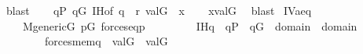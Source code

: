 \begin{isabellebody}
\ blast\isanewline
\ \ \isamarkupfalse%
\ {\isacartoucheopen}q{\isasymin}P{\isacartoucheclose}\ {\isacartoucheopen}q{\isasymin}G{\isacartoucheclose}\ IH{\isacharbrackleft}{\kern0pt}of\ q\ {\isasymsigma}{\isacharbrackright}{\kern0pt}\ {\isacartoucheopen}{\isasymlangle}{\isasymsigma}{\isacharcomma}{\kern0pt}r{\isasymrangle}{\isasymin}{\isasymtheta}{\isacartoucheclose}\ {\isacartoucheopen}val{\isacharparenleft}{\kern0pt}G{\isacharcomma}{\kern0pt}{\isasymsigma}{\isacharparenright}{\kern0pt}\ {\isacharequal}{\kern0pt}\ x{\isacartoucheclose}\isanewline
\ \ \isamarkupfalse%
\ {\isachardoublequoteopen}x{\isasymin}val{\isacharparenleft}{\kern0pt}G{\isacharcomma}{\kern0pt}{\isasymtau}{\isacharparenright}{\kern0pt}{\isachardoublequoteclose}\ \isamarkupfalse%
\ {\isacharparenleft}{\kern0pt}blast{\isacharparenright}{\kern0pt}\isanewline
{}\isamarkupfalse%
%
\endisatagproof
{\isafoldproof}%
%
\isadelimproof
\isanewline
%
\endisadelimproof
\isanewline
\isanewline
{}\isamarkupfalse%
\ IV{}{}{}a{\isacharunderscore}{\kern0pt}eq{\isacharcolon}{\kern0pt}\isanewline
\ \ \isanewline
\ \ \ \ {\isachardoublequoteopen}M{\isacharunderscore}{\kern0pt}generic{\isacharparenleft}{\kern0pt}G{\isacharparenright}{\kern0pt}{\isachardoublequoteclose}\ {\isachardoublequoteopen}p{\isasymin}G{\isachardoublequoteclose}\ {\isachardoublequoteopen}forces{\isacharunderscore}{\kern0pt}eq{\isacharparenleft}{\kern0pt}p{\isacharcomma}{\kern0pt}{\isasymtau}{\isacharcomma}{\kern0pt}{\isasymtheta}{\isacharparenright}{\kern0pt}{\isachardoublequoteclose}\isanewline
\ \ \ \ \isanewline
\ \ \ \ IH{\isacharcolon}{\kern0pt}{\isachardoublequoteopen}{\isasymAnd}q\ {\isasymsigma}{\isachardot}{\kern0pt}\ q{\isasymin}P\ {\isasymLongrightarrow}\ q{\isasymin}G\ {\isasymLongrightarrow}\ {\isasymsigma}{\isasymin}domain{\isacharparenleft}{\kern0pt}{\isasymtau}{\isacharparenright}{\kern0pt}\ {\isasymunion}\ domain{\isacharparenleft}{\kern0pt}{\isasymtheta}{\isacharparenright}{\kern0pt}\ {\isasymLongrightarrow}\ \isanewline
\ \ \ \ \ \ \ \ {\isacharparenleft}{\kern0pt}forces{\isacharunderscore}{\kern0pt}mem{\isacharparenleft}{\kern0pt}q{\isacharcomma}{\kern0pt}{\isasymsigma}{\isacharcomma}{\kern0pt}{\isasymtau}{\isacharparenright}{\kern0pt}\ {\isasymlongrightarrow}\ val{\isacharparenleft}{\kern0pt}G{\isacharcomma}{\kern0pt}{\isasymsigma}{\isacharparenright}{\kern0pt}\ {\isasymin}\ val{\isacharparenleft}{\kern0pt}G{\isacharcomma}{\kern0pt}{\isasymtau}{\isacharparenright}{\kern0pt}{\isacharparenright}{\kern0pt}\ {\isasymand}\isanewline

\end{isabellebody}
